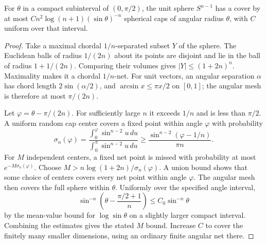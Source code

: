 \begin{lemma}
\label{lattice:sphere-cover}
For $\theta$ in a compact subinterval of $(0,\pi/2)$, the unit sphere
$S^{n-1}$ has a cover by at most
$C n^2\log(n+1)(\sin\theta)^{-n}$ spherical caps of angular radius
$\theta$, with $C$ uniform over that interval.
\end{lemma}

\begin{proof}
Take a maximal chordal $1/n$-separated subset $Y$ of the sphere. The
Euclidean balls of radius $1/(2n)$ about its points are disjoint and lie
in the ball of radius $1+1/(2n)$. Comparing their volumes gives
$|Y|\le(1+2n)^n$. Maximality makes it a chordal $1/n$-net. For unit
vectors, an angular separation $\alpha$ has chord length
$2\sin(\alpha/2)$, and $\arcsin x\le\pi x/2$ on $[0,1]$; the angular
mesh is therefore at most $\pi/(2n)$.

Let $\varphi=\theta-\pi/(2n)$. For sufficiently large $n$ it exceeds
$1/n$ and is less than $\pi/2$. A uniform random cap center covers a fixed
point within angle $\varphi$ with probability
\begin{equation*}
 \sigma_n(\varphi)
 =\frac{\int_0^\varphi\sin^{n-2}u\,du}
        {\int_0^\pi\sin^{n-2}u\,du}
 \ge\frac{\sin^{n-2}(\varphi-1/n)}{\pi n}.
\end{equation*}
For $M$ independent centers, a fixed net point is missed with probability
at most $e^{-M\sigma_n(\varphi)}$. Choose
$M>n\log(1+2n)/\sigma_n(\varphi)$. A union bound shows that some choice
of centers covers every net point within angle $\varphi$. The angular
mesh then covers the full sphere within $\theta$.
Uniformly over the specified angle interval,
\begin{equation*}
 \sin^{-n}\left(\theta-\frac{\pi/2+1}{n}\right)
 \le C_0\sin^{-n}\theta
\end{equation*}
by the mean-value bound for $\log\sin\theta$ on a slightly larger compact
interval. Combining the estimates gives the stated $M$ bound. Increase
$C$ to cover the finitely many smaller dimensions, using an ordinary
finite angular net there.
\end{proof}

